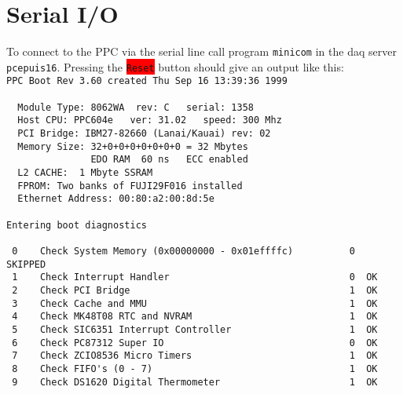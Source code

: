 \documentclass[10pt]{article}
\newcommand{\red}[1]{\colorbox{red}{\texttt{#1}}}
\begin{document}
\section{Serial I/O}
To connect to the PPC via the serial line call program \texttt{minicom} in the daq server \texttt{pcepuis16}.
Pressing the \red{Reset} button should give an output like this:\\

\verb+PPC Boot Rev 3.60 created Thu Sep 16 13:39:36 1999+\\
\verb+ +\\
\verb+  Module Type: 8062WA  rev: C   serial: 1358+\\
\verb+  Host CPU: PPC604e   ver: 31.02   speed: 300 Mhz+\\
\verb+  PCI Bridge: IBM27-82660 (Lanai/Kauai) rev: 02+\\
\verb-  Memory Size: 32+0+0+0+0+0+0+0 = 32 Mbytes-\\
\verb+               EDO RAM  60 ns   ECC enabled+\\
\verb+  L2 CACHE:  1 Mbyte SSRAM+\\
\verb+  FPROM: Two banks of FUJI29F016 installed+\\
\verb+  Ethernet Address: 00:80:a2:00:8d:5e+\\
\verb+ +\\
\verb+Entering boot diagnostics+\\
\verb+ +\\
\verb+ 0    Check System Memory (0x00000000 - 0x01effffc)          0  SKIPPED+\\
\verb+ 1    Check Interrupt Handler                                0  OK+\\
\verb+ 2    Check PCI Bridge                                       1  OK+\\
\verb+ 3    Check Cache and MMU                                    1  OK+\\
\verb+ 4    Check MK48T08 RTC and NVRAM                            1  OK+\\
\verb+ 5    Check SIC6351 Interrupt Controller                     1  OK+\\
\verb+ 6    Check PC87312 Super IO                                 0  OK+\\
\verb+ 7    Check ZCIO8536 Micro Timers                            1  OK+\\
\verb+ 8    Check FIFO's (0 - 7)                                   1  OK+\\
\verb+ 9    Check DS1620 Digital Thermometer                       1  OK+\\
\end{document}
